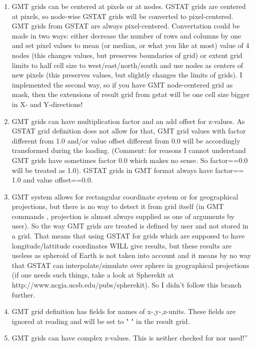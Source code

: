 \documentclass[a4paper,12pt]{book}
\begin{document}
\begin{enumerate}
\item GMT grids can be centered at pixels or at nodes. GSTAT grids
are centered at pixels, so node-wise GSTAT grids will be converted
to pixel-centered. GMT grids from GSTAT are always pixel-centered.
Convertation could be made in two ways: either decrease the number
of rows and columns by one and set pixel values to mean (or median,
or what you like at most) value of 4 nodes (this changes values, but
preserves boundaries of grid) or extent grid limits to half cell size
to west/east/north/south and use nodes as centers of new pixels (this
preserves values, but slightly changes the limits of grids). I implemented
the second way, so if you have GMT node-centered grid as mask, then the
extensions of result grid from gstat will be one cell size bigger in X-
and Y-directions!

\item GMT grids can have multiplication factor and an add offset for
z-values. As GSTAT grid definition does not allow for that, GMT grid
values with factor different from 1.0 and/or value offset different from
0.0 will be accordingly transformed during the loading. (Comment: for
reasons I cannot understand GMT grids have sometimes factor 0.0 which
makes no sense. So factor==0.0 will be treated as 1.0). GSTAT grids in
GMT format always have factor== 1.0 and value offset==0.0.

\item GMT system allows for rectangular coordinate system or for
geographical projections, but there is no way to detect it from grid
itself (in GMT commands , projection is almost always supplied as one
of arguments by user). So the way GMT grids are treated is defined by
user and not stored in a grid. That means that using GSTAT for grids
which are supposed to have longitude/lattitude coordinates WILL give
results, but these results are useless as spheroid of Earth is not taken
into account and it means by no way that GSTAT can interpolate/simulate
over sphere in geographical projections (if one needs such things, take
a look at Spherekit at http://www.ncgia.ucsb.edu/pubs/spherekit). So I
didn't follow this branch further.

\item GMT grid definition has fields for names of x-,y-,z-units. These
fields are ignored at reading and will be set to " " in the result grid.

\item GMT grids can have complex z-values. This is neither checked for
nor used!''
\end{enumerate}
\end{document}
